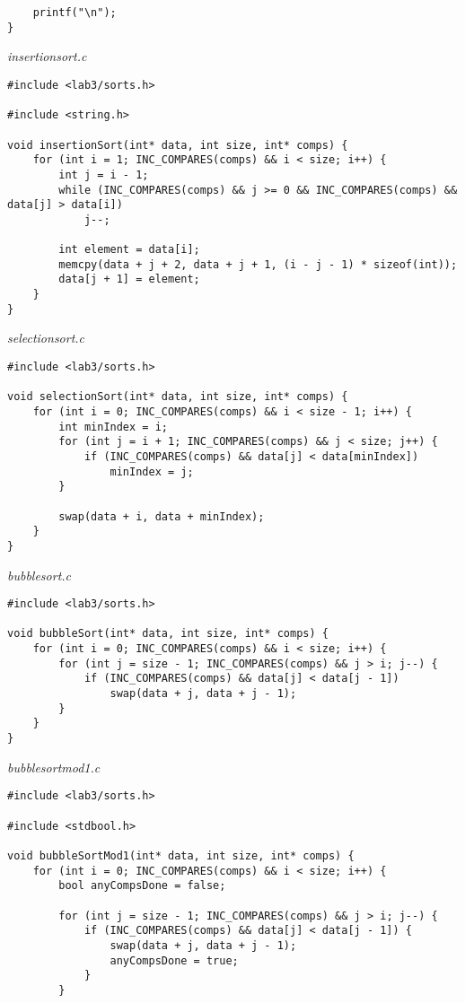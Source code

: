 \documentclass[a4paper,14pt]{extarticle}
\begin{document}
\begin{enumerate}
\begin{verbatim}
    printf("\n");
}
	\end{verbatim}
	      \textit{insertionsort.c}
	      \begin{verbatim}
#include <lab3/sorts.h>

#include <string.h>

void insertionSort(int* data, int size, int* comps) {
    for (int i = 1; INC_COMPARES(comps) && i < size; i++) {
        int j = i - 1;
        while (INC_COMPARES(comps) && j >= 0 && INC_COMPARES(comps) && data[j] > data[i])
            j--;

        int element = data[i];
        memcpy(data + j + 2, data + j + 1, (i - j - 1) * sizeof(int));
        data[j + 1] = element;
    }
}
	\end{verbatim}
	      \textit{selectionsort.c}
	      \begin{verbatim}
#include <lab3/sorts.h>

void selectionSort(int* data, int size, int* comps) {
    for (int i = 0; INC_COMPARES(comps) && i < size - 1; i++) {
        int minIndex = i;
        for (int j = i + 1; INC_COMPARES(comps) && j < size; j++) {
            if (INC_COMPARES(comps) && data[j] < data[minIndex])
                minIndex = j;
        }

        swap(data + i, data + minIndex);
    }
}
	\end{verbatim}
	      \textit{bubblesort.c}
	      \begin{verbatim}
#include <lab3/sorts.h>

void bubbleSort(int* data, int size, int* comps) {
    for (int i = 0; INC_COMPARES(comps) && i < size; i++) {
        for (int j = size - 1; INC_COMPARES(comps) && j > i; j--) {
            if (INC_COMPARES(comps) && data[j] < data[j - 1])
                swap(data + j, data + j - 1);
        }
    }
}
	\end{verbatim}
	      \textit{bubblesortmod1.c}
	      \begin{verbatim}
#include <lab3/sorts.h>

#include <stdbool.h>

void bubbleSortMod1(int* data, int size, int* comps) {
    for (int i = 0; INC_COMPARES(comps) && i < size; i++) {
        bool anyCompsDone = false;

        for (int j = size - 1; INC_COMPARES(comps) && j > i; j--) {
            if (INC_COMPARES(comps) && data[j] < data[j - 1]) {
                swap(data + j, data + j - 1);
                anyCompsDone = true;
            }
        }


\end{verbatim}
\end{enumerate}
\end{document}
